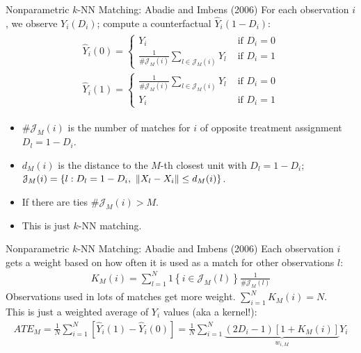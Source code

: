 \documentclass[aspectratio=169,11pt]{beamer}
\begin{document}
\begin{frame}{Nonparametric $k$-NN Matching: Abadie and Imbens (2006)}
For each observation $i$, we observe $Y_i(D_i)$; compute a \alert{counterfactual} $\hat{Y}_i(1-D_i)$:
\begin{align*}
\begin{array}{l}
\widehat{Y}_{i}(0)=\left\{\begin{array}{cl}
Y_{i} & \text { if } D_{i}=0 \\
\frac{1}{\# \mathcal{J}_{M}(i)} \sum_{l \in \mathcal{J}_{M}(i)} Y_{l} & \text { if } D_{i}=1
\end{array}\right. \\
\widehat{Y}_{i}(1)=\left\{\begin{array}{cc}
\frac{1}{\# \mathcal{J}_{M}(i)} \sum_{l \in \mathcal{J}_{M}(i)} Y_{l} & \text { if } D_{i}=0 \\
Y_{i} & \text { if } D_{i}=1
\end{array}\right.
\end{array}
\end{align*}
\begin{itemize}
\item $\# \mathcal{J}_{M}(i)$ is the number of matches for $i$ of opposite treatment assignment $D_l =1-D_i$.
\item $d_M(i)$ is the distance to the $M$-th closest unit with $D_l=1-D_i$; $\mathcal{J}_{M}(i)=\{l: D_l=1-D_i,\ \norm{X_l-X_i}\le d_M(i)\}$.
\item If there are ties $\# \mathcal{J}_{M}(i) > M$.
\item This is just $k$-NN matching.
\end{itemize}
\end{frame}



\begin{frame}{Nonparametric $k$-NN Matching: Abadie and Imbens (2006)}
Each observation $i$ gets a weight based on how often it is used as a match for other observations $l$:
\begin{align*}
K_{M}(i)=\sum_{l=1}^{N} 1\left\{i \in \mathcal{J}_{M}(l)\right\} \frac{1}{\# \mathcal{J}_{M}(l)}
\end{align*}
 Observations used in lots of matches get more weight. $\sum_{i=1}^N K_{M}(i) = N$.\\
 
This is just a weighted average of $Y_i$ values (aka a \alert{kernel}!):
\begin{align*}
ATE_M=\frac{1}{N} \sum_{i=1}^{N}\left[ \widehat{Y}_{i}(1)-\widehat{Y}_{i}(0)\right]=\frac{1}{N} \sum_{i=1}^{N} \underbrace{\left(2 D_{i}-1\right)\left[1+K_{M}(i)\right]}_{w_{i,M}} Y_{i}
\end{align*}
\end{frame}
\end{document}
